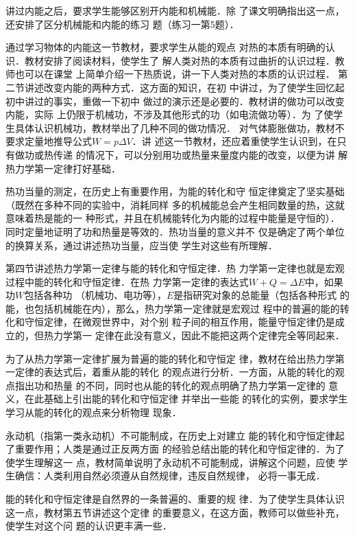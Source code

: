 讲过内能之后，要求学生能够区别开内能和机械能．除
了课文明确指出这一点，还安排了区分机械能和内能的练习
题（练习一第5题）．

通过学习物体的内能这一节教材，要求学生从能的观点
对热的本质有明确的认识．教材安排了阅读材料，使学生了
解人类对热的本质有过曲折的认识过程．教师也可以在课堂
上简单介绍一下热质说，讲一下人类对热的本质的认识过程．
第二节讲述改变内能的两种方式．这方面的知识，在初
中讲过，为了使学生回忆起初中讲过的事实，重做一下初中
做过的演示还是必要的．教材讲的做功可以改变内能，实际
上仍限于机械功，不涉及其他形式的功（如电流做功等）．为
了使学生具体认识机械功，教材举出了几种不同的做功情况．
对气体膨胀做功，教材不要求定量地推导公式$W=p\Delta V$．讲
述这一节教材，还应着重使学生认识到，在只有做功或热传递
的情况下，可以分别用功或热量来量度内能的改变，以便为讲
解热力学第一定律打好基础．

热功当量的测定，在历史上有重要作用，为能的转化和守
恒定律奠定了坚实基础（既然在多种不同的实验中，消耗同样
多的机械能总会产生相同数量的热，这就意味着热是能的一
种形式，并且在机械能转化为内能的过程中能量是守恒的）．
同时定量地证明了功和热量是等效的．热功当量的意义并不
仅是确定了两个单位的换算关系，通过讲述热功当量，应当使
学生对这些有所理解．

第四节讲述热力学第一定律与能的转化和守恒定律．热
力学第一定律也就是宏观过程中能的转化和守恒定律．在热
力学第一定律的表达式$W+Q=\Delta E$中，如果功$W$包括各种功
（机械功、电功等），$E$是指研究对象的总能量（包括各种形式
的能，也包括机械能在内），那么，热力学第一定律就是宏观过
程中的普遍的能的转化和守恒定律，在微观世界中，对个别
粒子间的相互作用，能量守恒定律仍是成立的，但热力学第一
定律在此没有意义，因此不能把这两个定律完全等同起来．

为了从热力学第一定律扩展为普遍的能的转化和守恒定
律，教材在给出热力学第一定律的表达式后，着重从能的转化
的观点进行分析．一方面，从能的转化的观点指出功和热量
的不同，同时也从能的转化的观点明确了热力学第一定律的
意义，在此基础上引出能的转化和守恒定律 并举出一些能
的转化的实例，要求学生学习从能的转化的观点来分析物理
现象．

永动机（指第一类永动机）不可能制成，在历史上对建立
能的转化和守恒定律起了重要作用；人类是通过正反两方面
的经验总结出能的转化和守恒定律的．为了使学生理解这一
点，教材简单说明了永动机不可能制成，讲解这个问题，应使
学生确信：人类利用自然必须遵从自然规律，违反自然规律，
必将一事无成．

能的转化和守恒定律是自然界的一条普遍的、重要的规
律．为了使学生具体认识这一点，教材第五节讲述这个定律
的重要意义，在这方面，教师可以做些补充，使学生对这个问
题的认识更丰满一些．

